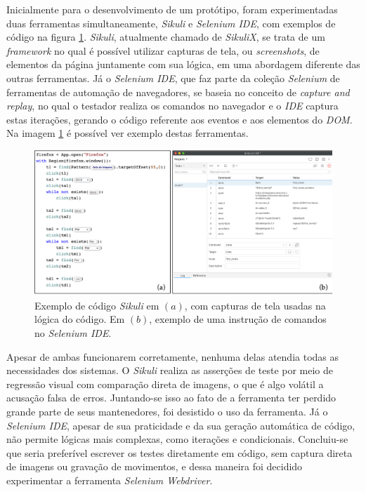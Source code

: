 Inicialmente para o desenvolvimento de um protótipo, foram experimentadas duas ferramentas simultaneamente, \emph{Sikuli} e \emph{Selenium IDE}, com exemplos de código na figura \ref{fig:e2e-ferramenta}. \emph{Sikuli}, atualmente chamado de \emph{SikuliX}, se trata de um \emph{framework} no qual é possível utilizar capturas de tela, ou \emph{screenshots}, de elementos da página juntamente com sua lógica, em uma abordagem diferente das outras ferramentas. Já o \emph{Selenium IDE}, que faz parte da coleção \emph{Selenium} de ferramentas de automação de navegadores, se baseia no conceito de \emph{capture and replay}, no qual o testador realiza os comandos no navegador e o \emph{IDE} captura estas iterações, gerando o código referente aos eventos e aos elementos do \emph{DOM}. Na imagem \ref{fig:e2e-ferramenta} é possível ver exemplo destas ferramentas.

\begin{figure}[H]
    \centering
    \includegraphics[width=15cm]{source/4-solucao/images/e2e-ferramenta.png}
    \caption{Exemplo de código \emph{Sikuli} em $(a)$, com capturas de tela usadas na lógica do código. Em $(b)$, exemplo de uma instrução de comandos no \emph{Selenium IDE}.}
    \label{fig:e2e-ferramenta}
\end{figure}

Apesar de ambas funcionarem corretamente, nenhuma delas atendia todas as necessidades dos sistemas. O \emph{Sikuli} realiza as asserções de teste por meio de regressão visual com comparação direta de imagens, o que é algo volátil a acusação falsa de erros. Juntando-se isso ao fato de a ferramenta ter perdido grande parte de seus mantenedores, foi desistido o uso da ferramenta. Já o \emph{Selenium IDE}, apesar de sua praticidade e da sua geração automática de código, não permite lógicas mais complexas, como iterações e condicionais. Concluiu-se que seria preferível escrever os testes diretamente em código, sem captura direta de imagens ou gravação de movimentos, e dessa maneira foi decidido experimentar a ferramenta \emph{Selenium Webdriver}.


